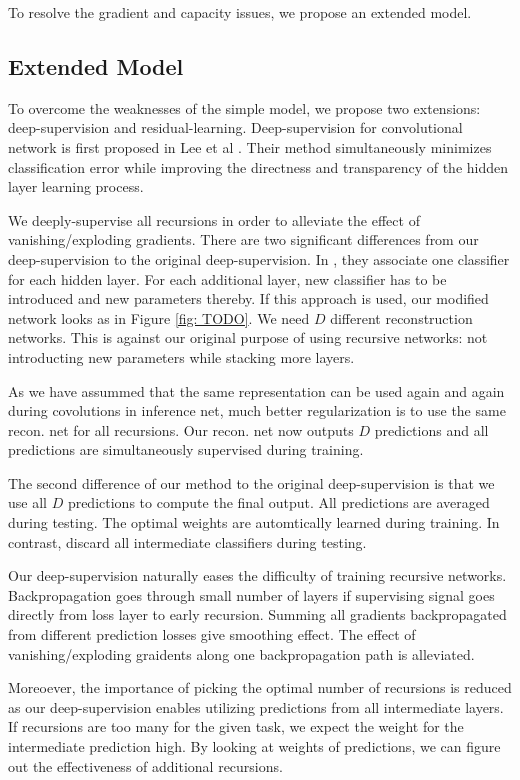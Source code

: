 \documentclass[10pt,twocolumn,letterpaper]{article}
\begin{document}
To resolve the gradient and capacity issues, we propose an extended model.

\subsection{Extended Model} 
To overcome the weaknesses of the simple model, we propose two extensions: deep-supervision and residual-learning. Deep-supervision for convolutional network is first proposed in Lee et al  \cite{lee2014deeply}. Their method simultaneously minimizes classification error while improving the directness and transparency of the hidden layer learning process.

We deeply-supervise all recursions in order to alleviate the effect of vanishing/exploding gradients. There are two significant differences from our deep-supervision to the original deep-supervision. In \cite{lee2014deeply}, they associate one classifier for each hidden layer. For each additional layer, new classifier has to be introduced and new parameters thereby. If this approach is used, our modified network looks as in Figure \ref{fig: TODO}. We need $D$ different reconstruction networks. This is against our original purpose of using recursive networks: not introducting new parameters while stacking more layers. 

As we have assummed that the same representation can be used again and again during covolutions in inference net, much better regularization is to use the same recon. net for all recursions. Our recon. net now outputs $D$ predictions and all predictions are simultaneously supervised during training. 

The second difference of our method to the original deep-supervision is that we use all $D$ predictions to compute the final output. All predictions are averaged during testing. The optimal weights are automtically learned during training. In contrast,  \cite{lee2014deeply} discard all intermediate classifiers during testing. 

Our deep-supervision naturally eases the difficulty of training recursive networks. Backpropagation goes through small number of layers if supervising signal goes directly from loss layer to early recursion. Summing all gradients backpropagated from different prediction losses give smoothing effect. The effect of vanishing/exploding graidents along one backpropagation path is alleviated.

Moreoever, the importance of picking the optimal number of recursions is reduced as our deep-supervision enables utilizing predictions from all intermediate layers. If recursions are too many for the given task, we expect the weight for the intermediate prediction high. By looking at weights of predictions, we can figure out the effectiveness of additional recursions. 
\end{document}
